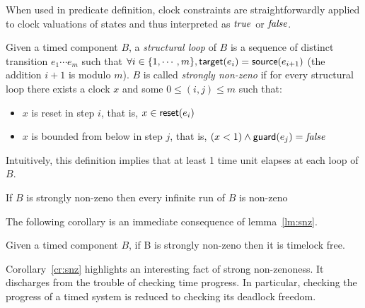 \begin{remark}
  When used in predicate definition, clock constraints are straightforwardly 
  applied to clock valuations of states and thus interpreted as $\textnormal{\textit{true}}$
  or $\textnormal{\textit{false}}$.
\end{remark}

\begin{definition}\label{def:snz}
  Given a timed component $B$, a \emph{structural loop} of $B$ is a sequence 
  of distinct transition $e_1\cdots e_m$ such that $\forall i\in\{1,\cdots,m
  \},\textsf{target}(e_i)= \textsf{source}(e_{i+1})$ (the addition $i+1$ is modulo $m$). 
  $B$ is called \emph{strongly non-zeno} 
  if for every structural loop there exists a clock $x$ and some $0\le (i,j)
  \le m$ such that:
  \begin{itemize}
    \item $x$ is reset in step $i$, that is, $x\in\textsf{reset}(e_i)$
    \item $x$ is bounded from below in step $j$, that is, $(x<1)\wedge\textsf{guard}(e_j)
      =\textnormal{\textit{false}}$
  \end{itemize}
\end{definition}
Intuitively, this definition implies that at least 1 time unit elapses 
at each loop of $B$.

\begin{lemma}\label{lm:snz}
  If $B$ is strongly non-zeno then every infinite run of $B$ is non-zeno
\end{lemma}

The following corollary is an immediate consequence of lemma~\ref{lm:snz}. 
\begin{corollary}\label{cr:snz}
Given a timed component $B$, if B is strongly non-zeno then it is 
  timelock free.
\end{corollary}

Corollary~\ref{cr:snz} highlights an interesting fact of strong non-zenoness.
It discharges from the trouble of checking time progress. In particular, checking
the progress of a timed system is reduced to checking its deadlock freedom.

